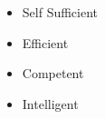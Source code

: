 %
%
%

\twocolumnsection
{
\begin{skills}
\end{skills}}
{
\vspace{1em}
\begin{itemize}
	\item Self Sufficient            
    \item Efficient
	\item Competent
    \item Intelligent
\end{itemize}
}
